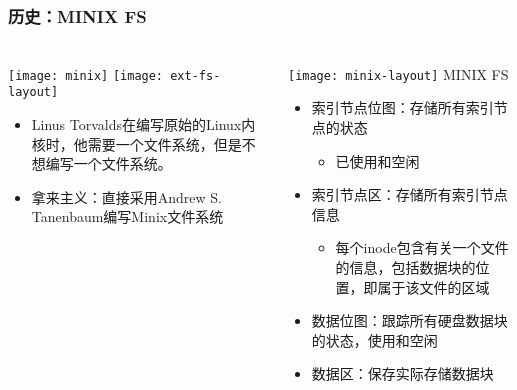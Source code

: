 \begin{frame}[fragile]
	\frametitle{历史：MINIX FS}
	
	\frametitle{ }
	\begin{columns}[t]
		\begin{column}{.4\textwidth}
			\texttt{[image: minix]}
			\texttt{[image: ext-fs-layout]}
			
			\begin{itemize}
				\item Linus Torvalds在编写原始的Linux内核时，他需要一个文件系统，但是不想编写一个文件系统。
				\item 拿来主义：直接采用Andrew S. Tanenbaum编写Minix文件系统
			\end{itemize}
			
		\end{column}
		
		\begin{column}{.6\textwidth}			
			\texttt{[image: minix-layout]}
			MINIX FS
			\begin{itemize}
				\item 索引节点位图：存储所有索引节点的状态
    			\begin{itemize}
    				\item 已使用和空闲
    			\end{itemize}
				\item 索引节点区：存储所有索引节点信息
    			\begin{itemize}
    				\item 每个inode包含有关一个文件的信息，包括数据块的位置，即属于该文件的区域
    			\end{itemize}
				\item 数据位图：跟踪所有硬盘数据块的状态，使用和空闲
				\item 数据区：保存实际存储数据块
			\end{itemize}
			
		\end{column}
	\end{columns}
	
\end{frame}


